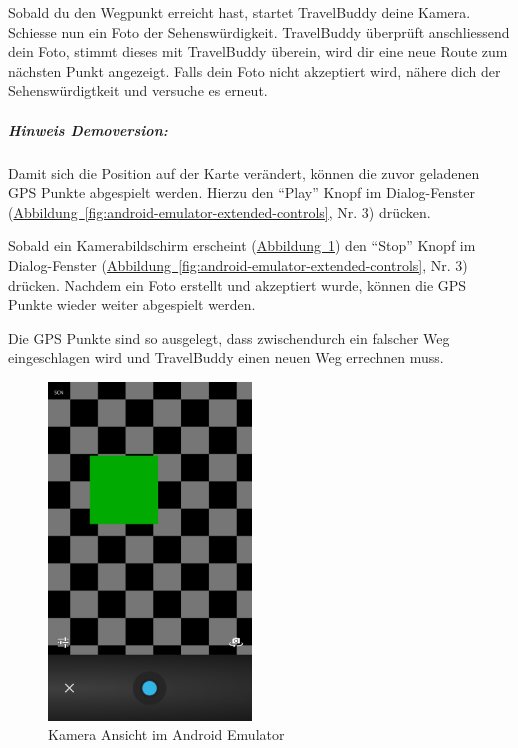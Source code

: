 \documentclass[a4paper,10pt,xetex]{article}
\begin{document}
Sobald du den Wegpunkt erreicht hast, startet TravelBuddy deine Kamera.
Schiesse nun ein Foto der Sehenswürdigkeit. TravelBuddy überprüft anschliessend dein Foto,
stimmt dieses mit TravelBuddy überein, wird dir eine neue Route zum nächsten Punkt
angezeigt. Falls dein Foto nicht akzeptiert wird, nähere dich der Sehenswürdigtkeit und versuche es erneut.

\subparagraph{Hinweis Demoversion:}
Damit sich die Position auf der Karte verändert, können die zuvor geladenen GPS Punkte
abgespielt werden. Hierzu den ``Play'' Knopf im Dialog-Fenster
(\hyperref[fig:android-emulator-extended-controls]{Abbildung~\ref*{fig:android-emulator-extended-controls}}, Nr. 3) drücken.

Sobald ein Kamerabildschirm erscheint (\hyperref[fig:android-emulator-camera]{Abbildung~\ref*{fig:android-emulator-camera}}) den ``Stop'' Knopf im Dialog-Fenster
(\hyperref[fig:android-emulator-extended-controls]{Abbildung~\ref*{fig:android-emulator-extended-controls}}, Nr. 3) drücken.
Nachdem ein Foto erstellt und akzeptiert wurde, können die GPS Punkte wieder weiter abgespielt werden.

Die GPS Punkte sind so ausgelegt, dass zwischendurch ein falscher Weg eingeschlagen wird und
TravelBuddy einen neuen Weg errechnen muss.

\begin{figure}
  \centering
  \includegraphics[width=0.48\textwidth]{screenshots/EmulatorCamera}
  \caption{Kamera Ansicht im Android Emulator}
  \label{fig:android-emulator-camera}
\end{figure}
\end{document}
